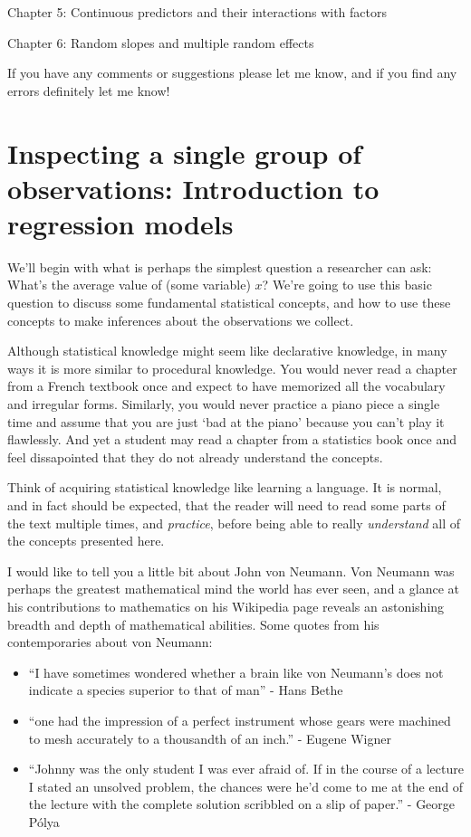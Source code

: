 \documentclass[
]{book}
\begin{document}
Chapter 5: Continuous predictors and their interactions with factors

Chapter 6: Random slopes and multiple random effects

If you have any comments or suggestions please let me know, and if you find any errors definitely let me know!

\hypertarget{inspecting-a-single-group-of-observations-introduction-to-regression-models}{%
\chapter{Inspecting a single group of observations: Introduction to regression models}\label{inspecting-a-single-group-of-observations-introduction-to-regression-models}}

We'll begin with what is perhaps the simplest question a researcher can ask: What's the average value of (some variable) \(x\)? We're going to use this basic question to discuss some fundamental statistical concepts, and how to use these concepts to make inferences about the observations we collect.

Although statistical knowledge might seem like declarative knowledge, in many ways it is more similar to procedural knowledge. You would never read a chapter from a French textbook once and expect to have memorized all the vocabulary and irregular forms. Similarly, you would never practice a piano piece a single time and assume that you are just `bad at the piano' because you can't play it flawlessly. And yet a student may read a chapter from a statistics book once and feel dissapointed that they do not already understand the concepts.

Think of acquiring statistical knowledge like learning a language. It is normal, and in fact should be expected, that the reader will need to read some parts of the text multiple times, and \emph{practice}, before being able to really \emph{understand} all of the concepts presented here.

I would like to tell you a little bit about John von Neumann. Von Neumann was perhaps the greatest mathematical mind the world has ever seen, and a glance at his contributions to mathematics on his Wikipedia page reveals an astonishing breadth and depth of mathematical abilities. Some quotes from his contemporaries about von Neumann:

\begin{itemize}
\item
  ``I have sometimes wondered whether a brain like von Neumann's does not indicate a species superior to that of man'' - Hans Bethe
\item
  ``one had the impression of a perfect instrument whose gears were machined to mesh accurately to a thousandth of an inch.'' - Eugene Wigner
\item
  ``Johnny was the only student I was ever afraid of. If in the course of a lecture I stated an unsolved problem, the chances were he'd come to me at the end of the lecture with the complete solution scribbled on a slip of paper.'' - George Pólya
\end{itemize}
\end{document}

